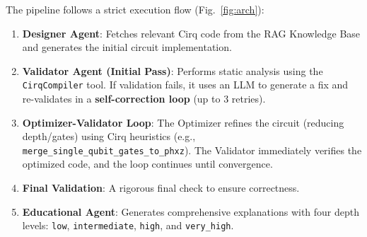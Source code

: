 \documentclass[runningheads]{llncs}
\begin{document}
The pipeline follows a strict execution flow (Fig.~\ref{fig:arch}):
\begin{enumerate}
    \item \textbf{Designer Agent}: Fetches relevant Cirq code from the RAG Knowledge Base and generates the initial circuit implementation.
    \item \textbf{Validator Agent (Initial Pass)}: Performs static analysis using the \texttt{Cirq\-Compiler} tool. If validation fails, it uses an LLM to generate a fix and re-validates in a \textbf{self-correction loop} (up to 3 retries).
    \item \textbf{Optimizer-Validator Loop}: The Optimizer refines the circuit (reducing depth/gates) using Cirq heuristics (e.g., \texttt{merge\_single\_qubit\_gates\_to\_phxz}). The Validator immediately verifies the optimized code, and the loop continues until convergence.
    \item \textbf{Final Validation}: A rigorous final check to ensure correctness.
    \item \textbf{Educational Agent}: Generates comprehensive explanations with four depth levels: \texttt{low}, \texttt{intermediate}, \texttt{high}, and \texttt{very\_high}.
\end{enumerate}
\end{document}
